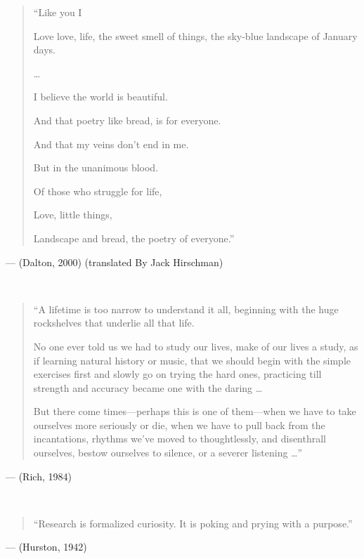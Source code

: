 \documentclass[
  letterpaper,
  DIV=11,
  numbers=noendperiod]{scrreprt}
\begin{document}

\begin{quote}
``Like you I

Love love, life, the sweet smell of things, the sky-blue landscape of
January days.

\ldots{}

I believe the world is beautiful.

And that poetry like bread, is for everyone.

And that my veins don't end in me.

But in the unanimous blood.

Of those who struggle for life,

Love, little things,

Landscape and bread, the poetry of everyone.'' 
 
\end{quote}

--- (Dalton, 2000) (translated By Jack Hirschman)

\(~\)

\begin{quote}
``A lifetime is too narrow to understand it all, beginning with the huge
rockshelves that underlie all that life.

No one ever told us we had to study our lives, make of our lives a
study, as if learning natural history or music, that we should begin
with the simple exercises first and slowly go on trying the hard ones,
practicing till strength and accuracy became one with the daring
\ldots{}

But there come times---perhaps this is one of them---when we have to
take ourselves more seriously or die, when we have to pull back from the
incantations, rhythms we've moved to thoughtlessly, and disenthrall
ourselves, bestow ourselves to silence, or a severer listening \ldots''
 
\end{quote}

--- (Rich, 1984)

\(~\)

\begin{quote}
``Research is formalized curiosity. It is poking and prying with a
purpose.'' 
\end{quote}

--- (Hurston, 1942)

\end{document}
